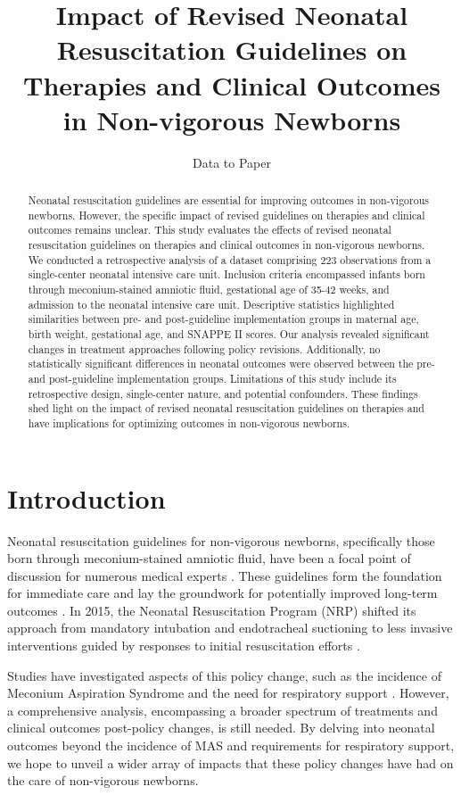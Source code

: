 \documentclass[11pt]{article}
\title{Impact of Revised Neonatal Resuscitation Guidelines on Therapies and Clinical Outcomes in Non-vigorous Newborns}
\author{Data to Paper}
\begin{document}
\maketitle
\begin{abstract}Neonatal resuscitation guidelines are essential for improving outcomes in non-vigorous newborns. However, the specific impact of revised guidelines on therapies and clinical outcomes remains unclear. This study evaluates the effects of revised neonatal resuscitation guidelines on therapies and clinical outcomes in non-vigorous newborns. We conducted a retrospective analysis of a dataset comprising 223 observations from a single-center neonatal intensive care unit. Inclusion criteria encompassed infants born through meconium-stained amniotic fluid, gestational age of 35-42 weeks, and admission to the neonatal intensive care unit. Descriptive statistics highlighted similarities between pre- and post-guideline implementation groups in maternal age, birth weight, gestational age, and SNAPPE II scores. Our analysis revealed significant changes in treatment approaches following policy revisions. Additionally, no statistically significant differences in neonatal outcomes were observed between the pre-and post-guideline implementation groups. Limitations of this study include its retrospective design, single-center nature, and potential confounders. These findings shed light on the impact of revised neonatal resuscitation guidelines on therapies and have implications for optimizing outcomes in non-vigorous newborns.\end{abstract}
\section*{Introduction}

Neonatal resuscitation guidelines for non-vigorous newborns, specifically those born through meconium-stained amniotic fluid, have been a focal point of discussion for numerous medical experts \cite{Chawla2020PerinatalNeonatalMO, Wyckoff2015Part1N}. These guidelines form the foundation for immediate care and lay the groundwork for potentially improved long-term outcomes \cite{Chawla2020PerinatalNeonatalMO}. In 2015, the Neonatal Resuscitation Program (NRP) shifted its approach from mandatory intubation and endotracheal suctioning to less invasive interventions guided by responses to initial resuscitation efforts \cite{Wyckoff2015Part1N}. 

Studies have investigated aspects of this policy change, such as the incidence of Meconium Aspiration Syndrome and the need for respiratory support \cite{Oommen2020ResuscitationON, Myers2020ImpactOT}. However, a comprehensive analysis, encompassing a broader spectrum of treatments and clinical outcomes post-policy changes, is still needed. By delving into neonatal outcomes beyond the incidence of MAS and requirements for respiratory support, we hope to unveil a wider array of impacts that these policy changes have had on the care of non-vigorous newborns.
\end{document}
